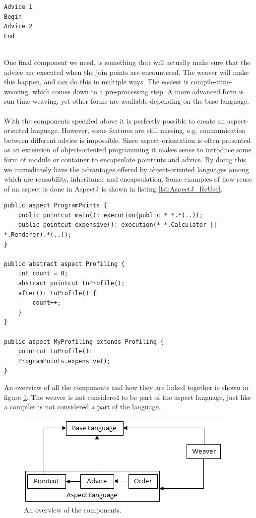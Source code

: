 \documentclass[a4paper]{report}
\begin{document}
\begin{minipage}{0.48\textwidth}
\begin{lstlisting}[caption=Output of the ordered advice.,label=lst:AspectJ_PrecedenceOutput]
Advice 1
Begin
Advice 2
End
\end{lstlisting}
\end{minipage}\\
One final component we need, is something that will actually make sure that the advice are executed when the join points are encountered. The weaver will make this happen, and can do this in multiple ways. The easiest is compile-time-weaving, which comes down to a pre-processing step. A more advanced form is run-time-weaving, yet other forms are available depending on the base language.\\
\\
With the components specified above it is perfectly possible to create an aspect-oriented language. However, some features are still missing, e.g. communication between different advice is impossible. Since aspect-orientation is often presented as an extension of object-oriented programming it makes sense to introduce some form of module or container to encapsulate pointcuts and advice. By doing this we immediately have the advantages offered by object-oriented languages among which are reusability, inheritance and encapsulation. Some examples of how reuse of an aspect is done in AspectJ is shown in listing \ref{lst:AspectJ_ReUse}.
\begin{lstlisting}[caption=Possibilities to reuse aspects.,label=lst:AspectJ_ReUse]
public aspect ProgramPoints {
	public pointcut main(): execution(public * *.*(..));
	public pointcut expensive(): execution(* *.Calculator || *.Renderer).*(..));
}

public abstract aspect Profiling {
	int count = 0;
	abstract pointcut toProfile();
	after(): toProfile() {
		count++;
	}
}

public aspect MyProfiling extends Profiling {
	pointcut toProfile():
	ProgramPoints.expensive();
}
\end{lstlisting}
An overview of all the components and how they are linked together is shown in figure \ref{fig:Aspect_Components}. The weaver is not considered to be part of the aspect language, just like a compiler is not considered a part of the language.
\begin{figure}[h!]
\centering
\includegraphics[scale=0.7]{images/AOF/Components.png}
\caption{An overview of the components.}
\label{fig:Aspect_Components}
\end{figure}
\end{document}
